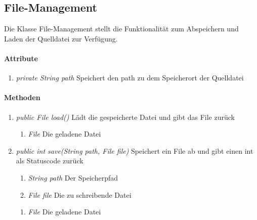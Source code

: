 \subsection{File-Management}
Die Klasse File-Management stellt die Funktionalität zum Abspeichern und Laden der Quelldatei zur Verfügung.

\paragraph{Attribute}

\begin{enumerate}[$\bullet$]
	\item \textit{private String path} Speichert den path zu dem Speicherort der Quelldatei
\end{enumerate}

\paragraph{Methoden}

\begin{enumerate}[+]
	\item \textit{public File load()} Lädt die gespeicherte Datei und gibt das File zurück
	\begin{enumerate}[$\circ$]
		\item \textit{File} Die geladene Datei
	\end{enumerate}
	\item \textit{public int save(String path, File file)} Speichert ein File ab und gibt einen int als Statuscode zurück
	\begin{enumerate}[$\bullet$]
		\item \textit{String path} Der Speicherpfad
		\item \textit{File file} Die zu schreibende Datei
	\end{enumerate}
	\begin{enumerate}[$\circ$]
	\item \textit{File} Die geladene Datei
	\end{enumerate}
\end{enumerate}